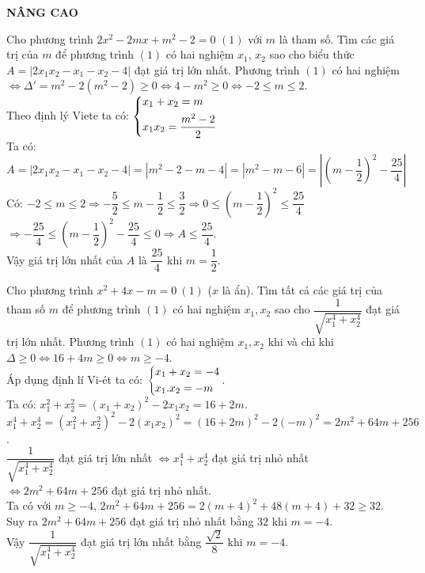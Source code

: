 \begin{center}
	\textbf{NÂNG CAO}
\end{center}
\begin{ex}%
	Cho phương trình $2x^2-2mx+m^2-2=0$ $(1)$ với $m$ là tham số. Tìm các giá trị của $m$ để phương trình $(1)$ có hai nghiệm $x_1$,  $x_2$ sao cho biểu thức $A=|2x_1x_2-x_1-x_2-4|$ đạt giá trị lớn nhất.
	\loigiai
	{Phương trình $(1)$ có hai nghiệm $\Leftrightarrow\Delta'=m^2-2(m^2-2)\ge0\Leftrightarrow4-m^2\ge0\Leftrightarrow-2\le m\le2$.\\
		Theo định lý Viete ta có: $\left\{\begin{aligned}&x_1+x_2=m\\&x_1x_2=\dfrac{m^2-2}{2}\end{aligned}\right.$\\
		Ta có: $A=|2x_1x_2-x_1-x_2-4|=|m^2-2-m-4|=|m^2-m-6|=\left|\left(m-\dfrac{1}{2}\right)^2-\dfrac{25}{4}\right|$\\
		Có: $-2\le m\le2\Rightarrow-\dfrac{5}{2}\le m-\dfrac{1}{2}\le\dfrac{3}{2}\Rightarrow0\le\left(m-\dfrac{1}{2}\right)^2\le\dfrac{25}{4}$\\
		
		$\Rightarrow-\dfrac{25}{4}\le\left(m-\dfrac{1}{2}\right)^2-\dfrac{25}{4}\le0\Rightarrow A\le\dfrac{25}{4}$.\\
		Vậy giá trị lớn nhất của $A$ là $\dfrac{25}{4}$ khi $m=\dfrac{1}{2}$.
	}
\end{ex}
\begin{ex}%
	Cho phương trình $x^2+4x-m=0 \ (1)$ ($x$ là ẩn). Tìm tất cả các giá trị của tham số $m$ để phương trình $(1)$ có hai nghiệm $x_1,x_2$ sao cho $\dfrac{1}{\sqrt{x_1^4+x_2^4}}$ đạt giá trị lớn nhất.
	\loigiai
	{
		Phương trình $(1)$ có hai nghiệm $x_1,x_2$ khi và chỉ khi $\Delta \ge 0\Leftrightarrow 16+4m\ge 0\Leftrightarrow m\ge -4$.\\
		Áp dụng định lí Vi-ét ta có: $\left\{\begin{aligned}&x_1+x_2=-4\\&x_1.x_2=-m\end{aligned}\right.$.\\
		Ta có: $x_1^2+x_2^2=\left(x_1+x_2\right)^2-2x_1x_2=16+2m$.\\
		$x_1^4+x_2^4=\left(x_1^2+x_2^2\right)^2-2\left(x_1x_2\right)^2=\left(16+2m\right)^2-2\left(-m\right)^2=2m^2+64m+256$.\\
		$\dfrac{1}{\sqrt{x_1^4+x_2^4}}$ đạt giá trị lớn nhất $\Leftrightarrow x_1^4+x_2^4$ đạt giá trị nhỏ nhất\\
		$\Leftrightarrow 2m^2+64m+256$ đạt giá trị nhỏ nhất.\\
		Ta có với $m\ge -4$, $2m^2+64m+256=2\left(m+4\right)^2+48\left(m+4\right)+32\ge 32$.\\
		Suy ra $2m^2+64m+256$ đạt giá trị nhỏ nhất bằng $32$ khi $m=-4$.\\
		Vậy $\dfrac{1}{\sqrt{x_1^4+x_2^4}}$ đạt giá trị lớn nhất bằng $\dfrac{\sqrt{2}}{8}$ khi $m=-4$.
	}
\end{ex}
